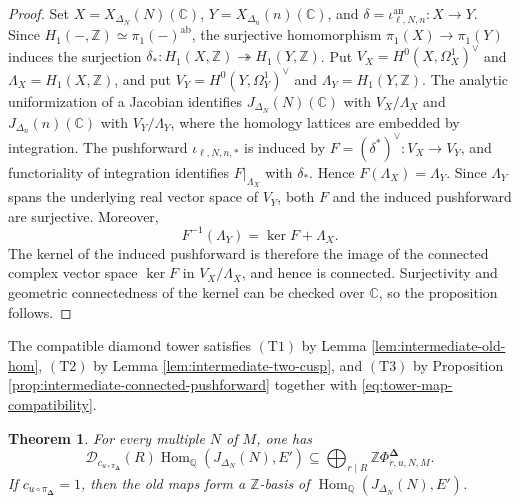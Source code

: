 \documentclass[12pt, letterpaper]{amsart}
\newtheorem{theorem}{Theorem}[section]
\theoremstyle{definition}
\theoremstyle{remark}
\newcommand{\Q}{\mathbb Q}
\newcommand{\C}{\mathbb C}
\newcommand{\Z}{\mathbb Z}
\newcommand{\Hom}{\operatorname{Hom}}
\numberwithin{equation}{section}
\begin{document}
\begin{proof}
Set \(X=X_{\Delta_N}(N)(\C)\), \(Y=X_{\Delta_n}(n)(\C)\), and
\(\delta=\iota_{\ell,N,n}^{\mathrm{an}}:X\to Y\).
Since \(H_1(-,\Z)\simeq\pi_1(-)^{\mathrm{ab}}\), the surjective homomorphism
\(\pi_1(X)\to\pi_1(Y)\) induces the surjection
\(\delta_*:H_1(X,\Z)\twoheadrightarrow H_1(Y,\Z)\).
Put \(V_X=H^0(X,\Omega_X^1)^\vee\) and \(\Lambda_X=H_1(X,\Z)\), and put
\(V_Y=H^0(Y,\Omega_Y^1)^\vee\) and \(\Lambda_Y=H_1(Y,\Z)\).
The analytic uniformization of a Jacobian
\cite{BirkenhakeLange}
identifies \(J_{\Delta_N}(N)(\C)\) with \(V_X/\Lambda_X\) and
\(J_{\Delta_n}(n)(\C)\) with \(V_Y/\Lambda_Y\), where the homology lattices
are embedded by integration. The pushforward \(\iota_{\ell,N,n,*}\) is
induced by \(F=(\delta^*)^\vee:V_X\to V_Y\), and functoriality of integration
identifies \(F|_{\Lambda_X}\) with \(\delta_*\). Hence
\(F(\Lambda_X)=\Lambda_Y\). Since
\(\Lambda_Y\) spans the underlying real vector space of \(V_Y\), both \(F\)
and the induced pushforward are surjective. Moreover,
\[
 F^{-1}(\Lambda_Y)=\ker F+\Lambda_X.
\]
The kernel of the induced pushforward is therefore the image of the connected
complex vector space \(\ker F\) in \(V_X/\Lambda_X\), and hence is connected.
Surjectivity and geometric connectedness of the kernel can be checked over
\(\C\), so the proposition follows.

\end{proof}

The compatible diamond tower satisfies \hyperlink{tower-condition-T1}{\(\mathrm{(T1)}\)} by Lemma
\ref{lem:intermediate-old-hom}, \hyperlink{tower-condition-T2}{\(\mathrm{(T2)}\)} by Lemma
\ref{lem:intermediate-two-cusp}, and \hyperlink{tower-condition-T3}{\(\mathrm{(T3)}\)} by Proposition
\ref{prop:intermediate-connected-pushforward} together with
\eqref{eq:tower-map-compatibility}.

\begin{theorem}\label{thm:intermediate-tower}
For every multiple \(N\) of \(M\), one has
\begin{equation}\label{eq:intermediate-lattice}
        \mathcal D_{c_{u\circ\pi_{\boldsymbol\Delta}}}(R)
        \Hom_\Q(J_{\Delta_N}(N),E')
        \subseteq
        \bigoplus_{r\mid R}\Z\Phi^{\boldsymbol\Delta}_{r,u,N,M}.
\end{equation}
If \(c_{u\circ\pi_{\boldsymbol\Delta}}=1\), then the old maps form a
\(\Z\)-basis of
\(\Hom_\Q(J_{\Delta_N}(N),E')\).
\end{theorem}
\end{document}
